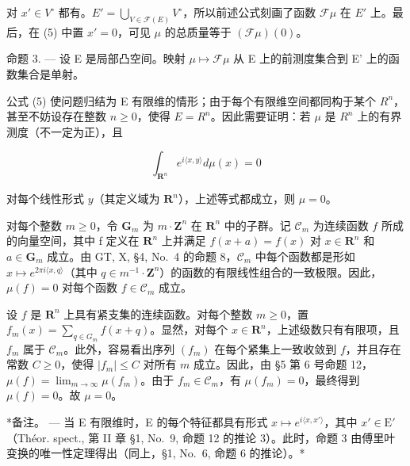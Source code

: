 对 \(x' \in V^{\circ}\) 都有。\(E' = \bigcup_{V \in \mathcal{F}(E)} V^{\circ}\)，所以前述公式刻画了函数 \(\mathcal{F}\mu\) 在 \(E'\) 上。最后，在 (5) 中置 \(x' = 0\)，可见 \(\mu\) 的总质量等于 \((\mathcal{F}\mu)(0)\)。

命题 3. --- 设 E 是局部凸空间。映射 \(\mu \mapsto \mathcal{F}\mu\) 从 E 上的前测度集合到 E' 上的函数集合是单射。

公式 (5) 使问题归结为 E 有限维的情形；由于每个有限维空间都同构于某个 \(R^{n}\)，甚至不妨设存在整数 \(n \geqslant 0\)，使得 \(E = R^{n}\)。因此需要证明：若 \(\mu\) 是 \(R^{n}\) 上的有界测度（不一定为正），且

\[
\int_ {\mathbf {R} ^ {n}} e ^ {i \langle x, y \rangle} d \mu (x) = 0
\]

对每个线性形式 \(y\)（其定义域为 \(\mathbf{R}^n\)），上述等式都成立，则 \(\mu = 0\)。

对每个整数 \(m \geqslant 0\)，令 \(\mathbf{G}_m\) 为 \(m \cdot \mathbf{Z}^n\) 在 \(\mathbf{R}^n\) 中的子群。记 \(\mathcal{C}_m\) 为连续函数 \(f\) 所成的向量空间，其中 f 定义在 \(\mathbf{R}^n\) 上并满足 \(f(x + a) = f(x)\) 对 \(x \in \mathbf{R}^n\) 和 \(a \in \mathbf{G}_m\) 成立。由 GT, X, §4, No.~4 的命题 8，\(\mathcal{C}_m\) 中每个函数都是形如 \(x \mapsto e^{2\pi i\langle x,q\rangle}\)（其中 \(q \in m^{-1} \cdot \mathbf{Z}^n\)）的函数的有限线性组合的一致极限。因此，\(\mu(f) = 0\) 对每个函数 \(f \in \mathcal{C}_m\) 成立。

设 \(f\) 是 \(\mathbf{R}^n\) 上具有紧支集的连续函数。对每个整数 \(m \geqslant 0\)，置 \(f_m(x) = \sum_{q \in G_m} f(x + q)\)。显然，对每个 \(x \in \mathbf{R}^n\)，上述级数只有有限项，且 \(f_m\) 属于 \(\mathcal{C}_m\)。此外，容易看出序列 \((f_m)\) 在每个紧集上一致收敛到 \(f\)，并且存在常数 \(C \geqslant 0\)，使得 \(|f_m| \leqslant C\) 对所有 \(m\) 成立。因此，由 §5 第 6 号命题 12，\(\mu(f) = \lim_{m \to \infty} \mu(f_m)\)。由于 \(f_m \in \mathcal{C}_m\)，有 \(\mu(f_m) = 0\)，最终得到 \(\mu(f) = 0\)。故 \(\mu = 0\)。

*备注。 --- 当 E 有限维时，E 的每个特征都具有形式 \(x \mapsto e^{i\langle x,x' \rangle}\)，其中 \(x' \in \mathrm{E}'\)（Théor. spect., 第 II 章 §1, No.~9, 命题 12 的推论 3）。此时，命题 3 由傅里叶变换的唯一性定理得出（同上，§1, No.~6, 命题 6 的推论）。*

